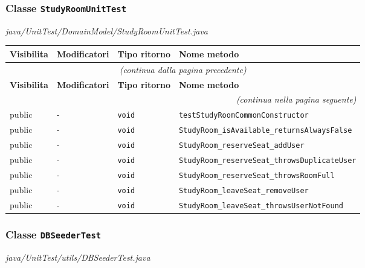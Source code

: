\subsubsection*{Classe \texttt{StudyRoomUnitTest}}\label{StudyRoomUnitTest}
{\small\textit{java/UnitTest/DomainModel/StudyRoomUnitTest.java}}
\vspace{4pt}

\begin{longtable}{@{}llll@{}}
\toprule
\textbf{Visibilita} & \textbf{Modificatori} & \textbf{Tipo ritorno} & \textbf{Nome metodo} \\
\midrule
\endfirsthead
\multicolumn{4}{c}{\small\itshape (continua dalla pagina precedente)} \\
\toprule
\textbf{Visibilita} & \textbf{Modificatori} & \textbf{Tipo ritorno} & \textbf{Nome metodo} \\
\midrule
\endhead
\midrule
\multicolumn{4}{r}{\small\itshape (continua nella pagina seguente)} \\
\endfoot
\bottomrule
\endlastfoot
  public & - & \texttt{void} & \texttt{testStudyRoomCommonConstructor} \\
  public & - & \texttt{void} & \texttt{StudyRoom\_isAvailable\_returnsAlwaysFalse} \\
  public & - & \texttt{void} & \texttt{StudyRoom\_reserveSeat\_addUser} \\
  public & - & \texttt{void} & \texttt{StudyRoom\_reserveSeat\_throwsDuplicateUser} \\
  public & - & \texttt{void} & \texttt{StudyRoom\_reserveSeat\_throwsRoomFull} \\
  public & - & \texttt{void} & \texttt{StudyRoom\_leaveSeat\_removeUser} \\
  public & - & \texttt{void} & \texttt{StudyRoom\_leaveSeat\_throwsUserNotFound} \\
\end{longtable}


\subsubsection*{Classe \texttt{DBSeederTest}}\label{DBSeederTest}
{\small\textit{java/UnitTest/utils/DBSeederTest.java}}
\vspace{4pt}


